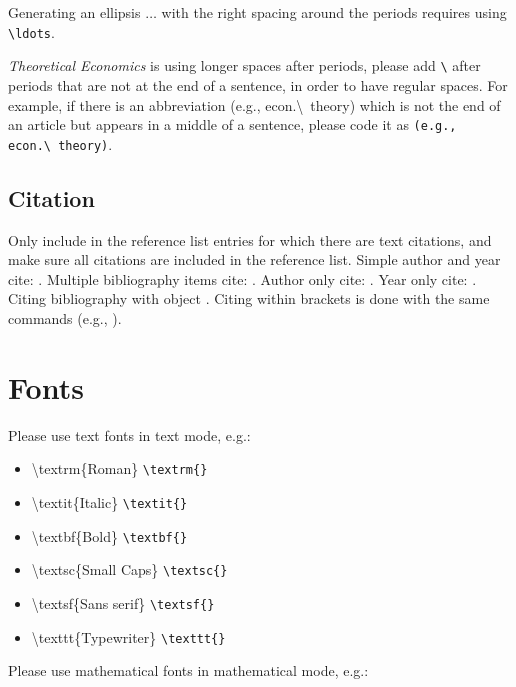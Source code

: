 \documentclass[qe,nameyear,draft]{econsocart}
\theoremstyle{plain}
\theoremstyle{remark}
\begin{document}
Generating an ellipsis $\ldots$ with the right spacing around the periods requires using \texttt{{\textbackslash}ldots}.

\textit{Theoretical Economics} is using longer spaces after periods, please add \texttt{{\textbackslash}} after periods that are not at the end of a sentence, in order to have regular spaces. For example, if there is an abbreviation (e.g., econ.{\textbackslash}~theory) which is not the end of an article but appears in a middle of a sentence, please code it as \texttt{(e.g., econ.{\textbackslash}~theory)}.

\subsection{Citation}

Only include in the reference list entries for which there are text citations,
and make sure all citations are included in the reference list.
Simple author and year cite: \citet{b1}.
Multiple bibliography items cite: \citep{b2, b3, b4, b5}.
Author only cite: \citet{b4}.
Year only cite: \citep{b4}. Citing bibliography with object \cite{b1}. Citing within brackets is done with the same commands (e.g., \citep{b2, b3, b4}).

\section{Fonts}

Please use text fonts in text mode, e.g.:

\begin{itemize}
\item {\textbackslash}textrm\{Roman\} \texttt{{\textbackslash}textrm\{\}}
\item {\textbackslash}textit\{Italic\} \texttt{{\textbackslash}textit\{\}}
\item {\textbackslash}textbf\{Bold\} \texttt{{\textbackslash}textbf\{\}}
\item {\textbackslash}textsc\{Small Caps\} \texttt{{\textbackslash}textsc\{\}}
\item {\textbackslash}textsf\{Sans serif\} \texttt{{\textbackslash}textsf\{\}}
\item {\textbackslash}texttt\{Typewriter\} \texttt{{\textbackslash}texttt\{\}}
\end{itemize}

Please use mathematical fonts in mathematical mode, e.g.:
\end{document}
